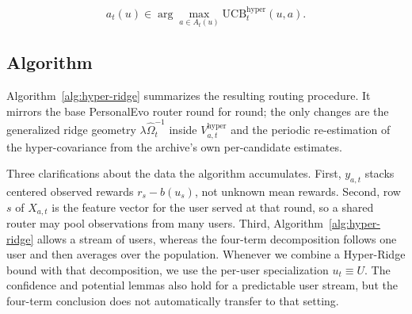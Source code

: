 \documentclass{article} %
\begin{document}
\begin{equation}
a_t(u) \in \arg\max_{a \in A_t(u)} \mathrm{UCB}_t^{\mathrm{hyper}}(u, a).
\end{equation}
\subsection{Algorithm}

\label{sec:method-alg}

Algorithm~\ref{alg:hyper-ridge} summarizes the resulting routing procedure.
It mirrors the base PersonalEvo router round for round; the only changes are
the generalized ridge geometry $\lambda \widehat{\Omega}_t^{-1}$ inside
$V_{a,t}^{\mathrm{hyper}}$ and the periodic re-estimation of the
hyper-covariance from the archive's own per-candidate estimates.

Three clarifications about the data the algorithm accumulates. First, $y_{a,t}$ stacks centered observed rewards $r_s-b(u_s)$, not unknown mean rewards. Second, row $s$ of $X_{a,t}$ is the feature vector for the user served at that round, so a shared router may pool observations from many users. Third, Algorithm~\ref{alg:hyper-ridge} allows a stream of users, whereas the four-term decomposition follows one user and then averages over the population. Whenever we combine a Hyper-Ridge bound with that decomposition, we use the per-user specialization $u_t\equiv U$. The confidence and potential lemmas also hold for a predictable user stream, but the four-term conclusion does not automatically transfer to that setting.
\end{document}
